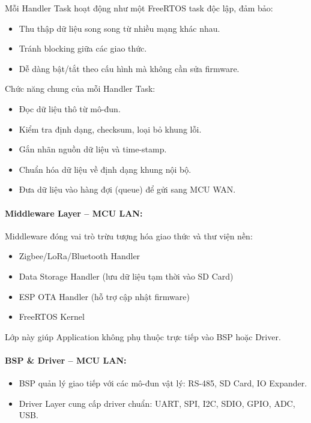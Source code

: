                 Mỗi Handler Task hoạt động như một FreeRTOS task độc lập, đảm bảo:
                \begin{itemize}
                    \item Thu thập dữ liệu song song từ nhiều mạng khác nhau.
                    \item Tránh blocking giữa các giao thức.
                    \item Dễ dàng bật/tắt theo cấu hình mà không cần sửa firmware.
                \end{itemize}
                
                Chức năng chung của mỗi Handler Task:
                \begin{itemize}
                    \item Đọc dữ liệu thô từ mô-đun.
                    \item Kiểm tra định dạng, checksum, loại bỏ khung lỗi.
                    \item Gắn nhãn nguồn dữ liệu và time-stamp.
                    \item Chuẩn hóa dữ liệu về định dạng khung nội bộ.
                    \item Đưa dữ liệu vào hàng đợi (queue) để gửi sang MCU WAN.
                \end{itemize}

            \paragraph{Middleware Layer – MCU LAN:}
                Middleware đóng vai trò trừu tượng hóa giao thức và thư viện nền:
                \begin{itemize}
                    \item Zigbee/LoRa/Bluetooth Handler
                    \item Data Storage Handler (lưu dữ liệu tạm thời vào SD Card)
                    \item ESP OTA Handler (hỗ trợ cập nhật firmware)
                    \item FreeRTOS Kernel
                \end{itemize}

            Lớp này giúp Application không phụ thuộc trực tiếp vào BSP hoặc Driver.

            \paragraph{BSP \& Driver – MCU LAN:}
                \begin{itemize}
                    \item BSP quản lý giao tiếp với các mô-đun vật lý: RS-485, SD Card, IO Expander.
                    \item Driver Layer cung cấp driver chuẩn: UART, SPI, I2C, SDIO, GPIO, ADC, USB.
                \end{itemize}

